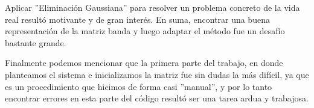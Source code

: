 	Aplicar ''Eliminación Gaussiana'' para resolver un problema concreto de la vida real resultó motivante y de gran
interés. En suma, encontrar una buena representación de la matriz banda y luego adaptar el método fue un desafío
bastante grande.

	Finalmente podemos mencionar que la primera parte del trabajo, en donde planteamos el sistema e inicializamos
la matriz fue sin dudas la más difícil, ya que es un procedimiento que hicimos de forma casi ''manual'', y por lo
tanto encontrar
errores en esta parte del código resultó ser una tarea ardua y trabajosa.